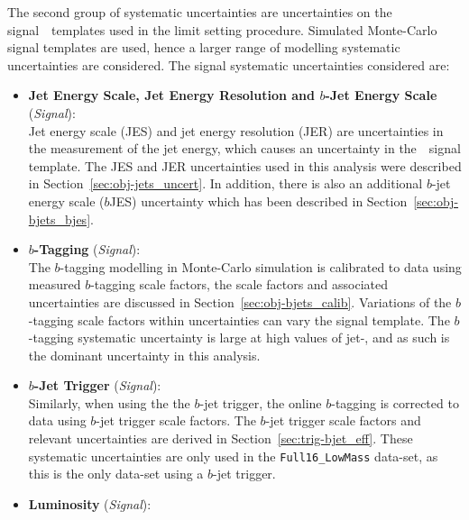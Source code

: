 The second group of systematic uncertainties are uncertainties on the signal~\mjj~templates used in the limit setting procedure.
Simulated Monte-Carlo signal templates are used,
hence a larger range of modelling systematic uncertainties are considered.
The signal systematic uncertainties considered are:

\begin{itemize}[leftmargin=*]
\item\textbf{Jet Energy Scale, Jet Energy Resolution  and $b$-Jet Energy Scale} \hspace{1mm} (\textit{Signal}):\\
  Jet energy scale (JES) and jet energy resolution (JER) are uncertainties in the measurement of the jet energy,
  which causes an uncertainty in the~\mjj~signal template.
  The JES and JER uncertainties used in this analysis were described in Section~\ref{sec:obj-jets_uncert}.
  In addition, there is also an additional $b$-jet energy scale ($b$JES) uncertainty which
  has been described in Section~\ref{sec:obj-bjets_bjes}.
  \vspace{0.5em}
\item\textbf{$b$-Tagging} \hspace{1mm} (\textit{Signal}):\\
  The $b$-tagging modelling in Monte-Carlo simulation is calibrated to data using measured $b$-tagging scale factors,
  the scale factors and associated uncertainties are discussed in Section~\ref{sec:obj-bjets_calib}.
  Variations of the $b$-tagging scale factors within uncertainties can vary the signal template.
  The $b$-tagging systematic uncertainty is large at high values of jet-\pT, and as such is the dominant uncertainty in this analysis.
  \vspace{0.5em}
\item\textbf{$b$-Jet Trigger} \hspace{1mm} (\textit{Signal}):\\
  Similarly, when using the the $b$-jet trigger, the online $b$-tagging is corrected to data using
  $b$-jet trigger scale factors.
  The $b$-jet trigger scale factors and relevant uncertainties are derived in Section~\ref{sec:trig-bjet_eff}.
  These systematic uncertainties are only used in the \verb|Full16_LowMass| data-set, as this is the only data-set using a $b$-jet trigger.
  \vspace{0.5em}
\item\textbf{Luminosity} \hspace{1mm} (\textit{Signal}):\\

\end{itemize}
